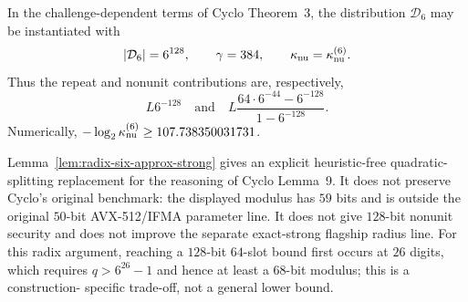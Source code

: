 \begin{corollary}
\label{cor:radix-six-cyclo-interface}
In the challenge-dependent terms of Cyclo Theorem~3, the distribution
$\mathcal D_6$ may be instantiated with
\[
 |\mathcal D_6|=6^{128},\qquad
 \gamma=384,\qquad
 \kappa_{\rm nu}=\kappa_{\rm nu}^{(6)}.
\]
Thus the repeat and nonunit contributions are, respectively,
\[
 L6^{-128}
 \quad\text{and}\quad
 L\frac{64\cdot6^{-44}-6^{-128}}{1-6^{-128}}.
\]
Numerically,
$-\log_2\kappa_{\rm nu}^{(6)}\ge107.738350031731$.
\end{corollary}

\begin{remark}
Lemma~\ref{lem:radix-six-approx-strong} gives an explicit heuristic-free
quadratic-splitting replacement for the reasoning of Cyclo Lemma~9.  It does
not preserve Cyclo's original benchmark: the displayed modulus has $59$ bits
and is outside the original $50$-bit AVX-512/IFMA parameter line.  It does not
give $128$-bit nonunit security and does not improve the separate exact-strong
flagship radius line.  For this radix argument, reaching a $128$-bit
$64$-slot bound first occurs at $26$ digits, which requires
$q>6^{26}-1$ and hence at least a $68$-bit modulus; this is a construction-
specific trade-off, not a general lower bound.
\end{remark}
